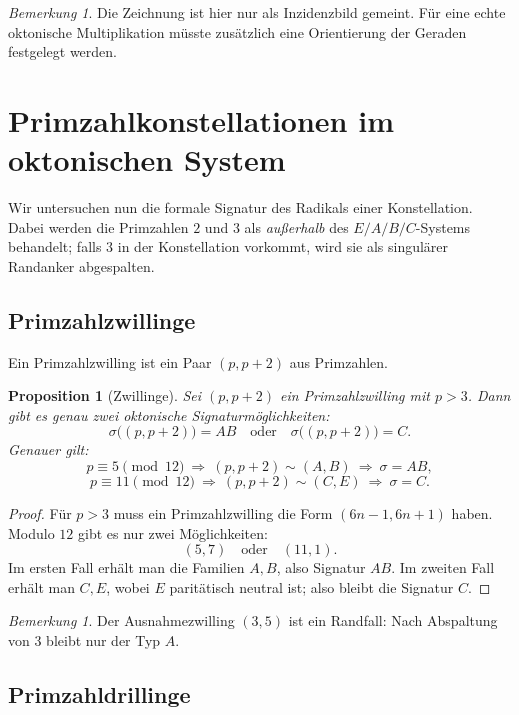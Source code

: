 \documentclass[11pt,a4paper]{article}
\newtheorem{proposition}[satz]{Proposition}
\theoremstyle{definition}
\theoremstyle{remark}
\newtheorem{bemerkung}[satz]{Bemerkung}
\newcommand{\sig}{\sigma}
\begin{document}
	\begin{bemerkung}
		Die Zeichnung ist hier nur als Inzidenzbild gemeint. Für eine echte oktonische
		Multiplikation müsste zusätzlich eine Orientierung der Geraden festgelegt werden.
	\end{bemerkung}
	
	\section{Primzahlkonstellationen im oktonischen System}
	
	Wir untersuchen nun die formale Signatur des Radikals einer Konstellation.
	Dabei werden die Primzahlen \(2\) und \(3\) als \emph{außerhalb} des \(E/A/B/C\)-Systems
	behandelt; falls \(3\) in der Konstellation vorkommt, wird sie als singulärer
	Randanker abgespalten.
	
	\subsection{Primzahlzwillinge}
	
	Ein Primzahlzwilling ist ein Paar \((p,p+2)\) aus Primzahlen.
	
	\begin{proposition}[Zwillinge]
		Sei \((p,p+2)\) ein Primzahlzwilling mit \(p>3\). Dann gibt es genau zwei
		oktonische Signaturmöglichkeiten:
		\[
		\sig\bigl((p,p+2)\bigr)=AB \quad\text{oder}\quad \sig\bigl((p,p+2)\bigr)=C.
		\]
		Genauer gilt:
		\[
		p\equiv 5 \pmod{12}\ \Longrightarrow\ (p,p+2)\sim (A,B)\ \Longrightarrow\ \sig=AB,
		\]
		\[
		p\equiv 11 \pmod{12}\ \Longrightarrow\ (p,p+2)\sim (C,E)\ \Longrightarrow\ \sig=C.
		\]
	\end{proposition}
	
	\begin{proof}
		Für \(p>3\) muss ein Primzahlzwilling die Form \((6n-1,6n+1)\) haben.
		Modulo \(12\) gibt es nur zwei Möglichkeiten:
		\[
		(5,7)\quad\text{oder}\quad (11,1).
		\]
		Im ersten Fall erhält man die Familien \(A,B\), also Signatur \(AB\).
		Im zweiten Fall erhält man \(C,E\), wobei \(E\) paritätisch neutral ist;
		also bleibt die Signatur \(C\).
	\end{proof}
	
	\begin{bemerkung}
		Der Ausnahmezwilling \((3,5)\) ist ein Randfall: Nach Abspaltung von \(3\) bleibt
		nur der Typ \(A\).
	\end{bemerkung}
	
	\subsection{Primzahldrillinge}
	
\end{document}
